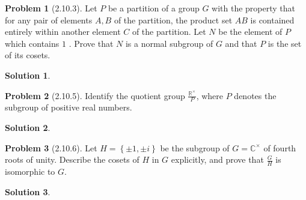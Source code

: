 \documentclass[12pt]{article}
\theoremstyle{definition} %
\newtheorem{solution}{Solution}
\newtheorem{problem}{Problem}
\theoremstyle{plain} %
\begin{document}
\begin{problem}[2.10.3]
   Let $P$ be a partition of a group $G$ with the property that for any pair of elements $A,B$ of the partition, the product set $AB$ is contained entirely within another element $C$ of the partition. Let $N$ be the element of $P$ which contains $1$ . Prove that $N$ is a normal subgroup of $G$ and that $P$ is the set of its cosets. 
\end{problem}
\begin{solution}
    
\end{solution}
\begin{problem}[2.10.5]
   Identify the quotient group $\frac{\mathbb{{R}}^{\times}}{P}$, where $P$ denotes the subgroup of positive real numbers.  
\end{problem}
\begin{solution}
    
\end{solution}
\begin{problem}[2.10.6]
  Let $H=\left\{ \pm 1, \pm i \right\} $  be the subgroup of $G=\mathbb{{C}}^{\times}$ of fourth roots of unity. Describe the cosets of $H$ in $G$ explicitly, and prove that $\frac{G}{H}$   is isomorphic to $G$. 
\end{problem}
\begin{solution}
    
\end{solution}
\end{document}
